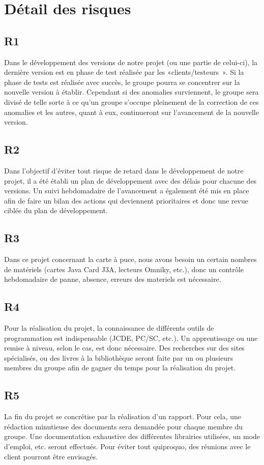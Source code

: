 \documentclass[a4paper,11pt,french]{article}
\begin{document}
\section{Détail des risques}

\subsection*{R1}
Dans le développement des versions de notre projet (ou une partie de celui-ci),
la dernière version est en phase de test réalisée par les «clients/testeurs ».
Si la phase de tests est réalisée avec succès, le groupe pourra se concentrer
sur la nouvelle version à établir. Cependant si des anomalies surviennent, le
groupe sera divisé de telle sorte à ce qu’un groupe s’occupe pleinement de la
correction de ces anomalies et les autres, quant à eux, continueront sur
l’avancement de la nouvelle version.

\subsection*{R2}
Dans l’objectif d’éviter tout risque de retard dans le développement de notre
projet, il a été établi un plan de développement avec des délais pour chacune
des versions. Un suivi hebdomadaire de l’avancement a également été mis en place
afin de faire un bilan des actions qui deviennent prioritaires et donc une revue
ciblée du plan de développement.

\subsection*{R3}
Dans ce projet concernant la carte à puce, nous avons besoin un certain nombres 
de matériels (cartes Java Card J3A, lecteurs Omniky, etc.), donc un contrôle hebdomadaire 
de panne, absence, erreurs des materiels est nécessaire. 


\subsection*{R4}
Pour la réalisation du projet, la connaissance de différents outils de
programmation est indispensable (JCDE, PC/SC, etc.). Un apprentissage ou
une remise à niveau, selon le cas, est donc nécessaire. Des recherches sur des
sites spécialisés, ou des livres à la bibliothèque seront faite par un ou
plusieurs membres du groupe afin de gagner du temps pour la réalisation du
projet.


\subsection*{R5}
La fin du projet se concrétise par la réalisation d’un rapport. Pour cela, une
rédaction minutieuse des documents sera demandée pour chaque membre du groupe.
Une documentation exhaustive des différentes librairies utilisées, un mode
d’emploi, etc. seront effectués. Pour éviter tout quiproquo, des réunions avec
le client pourront être envisagés.
\end{document}
